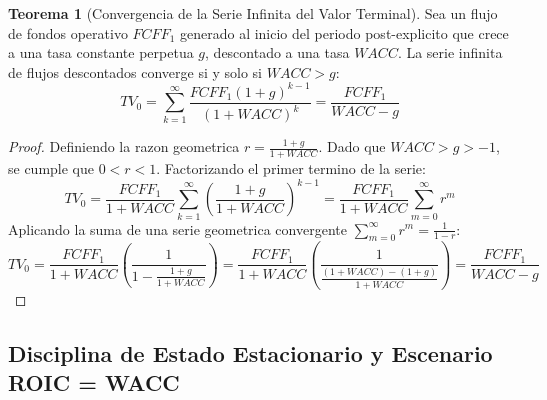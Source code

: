\documentclass[10pt,a4paper]{article}
\theoremstyle{definition}
\newtheorem{teorema}{\color{primary}\textbf{Teorema}}[section]
\begin{document}
\begin{teorema}[Convergencia de la Serie Infinita del Valor Terminal]
Sea un flujo de fondos operativo $FCFF_1$ generado al inicio del periodo post-explicito que crece a una tasa constante perpetua $g$, descontado a una tasa $WACC$. La serie infinita de flujos descontados converge si y solo si $WACC > g$:
\begin{equation}
TV_0 = \sum_{k=1}^{\infty} \frac{FCFF_1 (1 + g)^{k-1}}{(1 + WACC)^k} = \frac{FCFF_1}{WACC - g}
\end{equation}
\end{teorema}

\begin{proof}
Definiendo la razon geometrica $r = \frac{1+g}{1+WACC}$. Dado que $WACC > g > -1$, se cumple que $0 < r < 1$. Factorizando el primer termino de la serie:
\begin{equation}
TV_0 = \frac{FCFF_1}{1+WACC} \sum_{k=1}^\infty \left( \frac{1+g}{1+WACC} \right)^{k-1} = \frac{FCFF_1}{1+WACC} \sum_{m=0}^\infty r^m
\end{equation}
Aplicando la suma de una serie geometrica convergente $\sum_{m=0}^\infty r^m = \frac{1}{1 - r}$:
\begin{equation}
TV_0 = \frac{FCFF_1}{1+WACC} \left( \frac{1}{1 - \frac{1+g}{1+WACC}} \right) = \frac{FCFF_1}{1+WACC} \left( \frac{1}{\frac{(1+WACC) - (1+g)}{1+WACC}} \right) = \frac{FCFF_1}{WACC - g}
\end{equation}
\end{proof}

\subsection{Disciplina de Estado Estacionario y Escenario ROIC = WACC}
\end{document}
